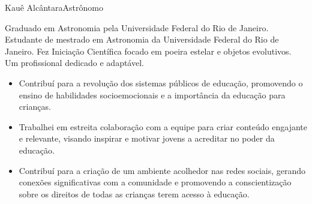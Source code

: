 \documentclass{article}
\begin{document}
\begin{cv}[fotocv]{Kauê Alcântara}{Astrônomo}


Graduado em Astronomia pela Universidade Federal do Rio de Janeiro. Estudante de mestrado em Astronomia da Universidade Federal do Rio de Janeiro. Fez Iniciação Científica focado em poeira estelar e objetos evolutivos. 
Um profissional dedicado e adaptável.


\begin{cvevent}[2025][2023]
\end{cvevent}

\begin{cvevent}[2023][2020]
    \begin{itemize}
        \item Contribuí para a revolução dos sistemas públicos de educação, promovendo o ensino de habilidades socioemocionais e a importância da educação para crianças.
        \item Trabalhei em estreita colaboração com a equipe para criar conteúdo engajante e relevante, visando inspirar e motivar jovens a acreditar no poder da educação.
        \item Contribuí para a criação de um ambiente acolhedor nas redes sociais, gerando conexões significativas com a comunidade e promovendo a conscientização sobre os direitos de todas as crianças terem acesso à educação.
    \end{itemize}
\end{cvevent}

\begin{cvevent}[2020]
\end{cvevent}



\begin{cvevent}[presente][2026]
\end{cvevent}

\begin{cvevent}[2026][2022]
\end{cvevent}


\end{cv}
\end{document}
